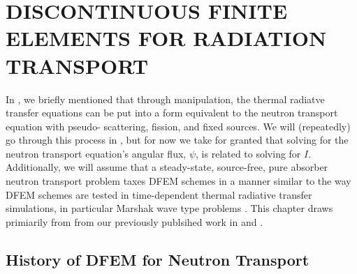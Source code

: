 %
%
%


\chapter{\uppercase {Discontinuous Finite Elements for Radiation Transport}}
\label{sec:chapter2_constant_xs}

In , we briefly mentioned that through manipulation, the thermal radiatve transfer equations can be put into a form equivalent to the 
neutron transport equation with pseudo- scattering, fission, and fixed sources.  
We will (repeatedly) go through this process in , but for now we 
take for granted that solving for the neutron transport equation's angular flux, $\psi$, is related to solving  for $I$.
Additionally, we will assume that a steady-state, source-free, pure absorber neutron transport problem taxes DFEM schemes in a manner similar to the way DFEM schemes are tested
in time-dependent thermal radiative transfer simulations, in particular Marshak wave type problems \cite{ober_shadid}.  This chapter draws primiarily from
from our previously publsihed work in \cite{mc_2013} and \cite{part_1_paper}.

\section{History of DFEM for Neutron Transport}


